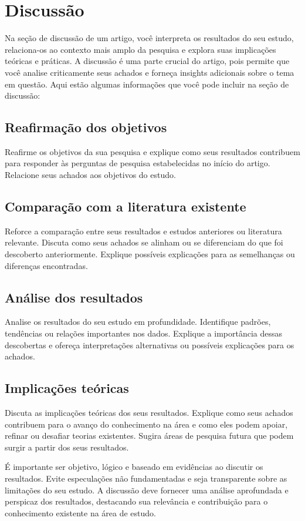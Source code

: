 \section{Discussão}\label{:discussion}

Na seção de discussão de um artigo, você interpreta os resultados do seu estudo, relaciona-os ao contexto mais amplo da pesquisa e explora suas implicações teóricas e práticas. A discussão é uma parte crucial do artigo, pois permite que você analise criticamente seus achados e forneça insights adicionais sobre o tema em questão. Aqui estão algumas informações que você pode incluir na seção de discussão:

\subsection{Reafirmação dos objetivos}
Reafirme os objetivos da sua pesquisa e explique como seus resultados contribuem para responder às perguntas de pesquisa estabelecidas no início do artigo. Relacione seus achados aos objetivos do estudo.

\subsection{Comparação com a literatura existente} 
Reforce a comparação entre seus resultados e estudos anteriores ou literatura relevante. Discuta como seus achados se alinham ou se diferenciam do que foi descoberto anteriormente. Explique possíveis explicações para as semelhanças ou diferenças encontradas.

\subsection{Análise dos resultados}
Analise os resultados do seu estudo em profundidade. Identifique padrões, tendências ou relações importantes nos dados. Explique a importância dessas descobertas e ofereça interpretações alternativas ou possíveis explicações para os achados.

\subsection{Implicações teóricas}
Discuta as implicações teóricas dos seus resultados. Explique como seus achados contribuem para o avanço do conhecimento na área e como eles podem apoiar, refinar ou desafiar teorias existentes. Sugira áreas de pesquisa futura que podem surgir a partir dos seus resultados.

É importante ser objetivo, lógico e baseado em evidências ao discutir os resultados. Evite especulações não fundamentadas e seja transparente sobre as limitações do seu estudo. A discussão deve fornecer uma análise aprofundada e perspicaz dos resultados, destacando sua relevância e contribuição para o conhecimento existente na área de estudo.
